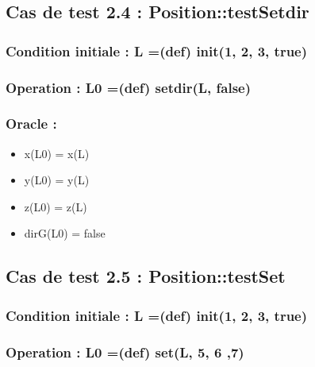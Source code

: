 \documentclass[11pt]{article}
\begin{document}
\subsection{Cas de test 2.4 : Position::testSetdir}
\label{sec-1.5}

\subsubsection{Condition initiale : L =(def) init(1, 2, 3, true)}
\label{sec-1.5.1}

\subsubsection{Operation : L0 =(def) setdir(L, false)}
\label{sec-1.5.2}

\subsubsection{Oracle :}
\label{sec-1.5.3}

\begin{itemize}

\item x(L0) = x(L)\\
\label{sec-1.5.3.1}


\item y(L0) = y(L)\\
\label{sec-1.5.3.2}


\item z(L0) = z(L)\\
\label{sec-1.5.3.3}


\item dirG(L0) = false\\
\label{sec-1.5.3.4}


\end{itemize} %
\subsection{Cas de test 2.5 : Position::testSet}
\label{sec-1.6}

\subsubsection{Condition initiale : L =(def) init(1, 2, 3, true)}
\label{sec-1.6.1}

\subsubsection{Operation : L0 =(def) set(L, 5, 6 ,7)}
\label{sec-1.6.2}
\end{document}
